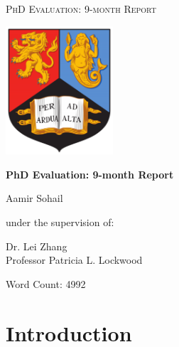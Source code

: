 \documentclass[12pt,a4paper,oneside,]{book} %
\begin{document}
\frontmatter
\thispagestyle{empty}
\def\drop{.1\textheight}

\vspace*{\drop}
\begin{center}
\Huge \textsc{PhD Evaluation: 9-month Report}
\end{center}

\clearpage
\thispagestyle{empty}
\vspace*{\drop}
\begin{center}
    \includegraphics[width=0.3\textwidth]{figures/birmingham.png} %
\end{center}
\vspace{\baselineskip}

\begin{center}
\Huge\textbf{PhD Evaluation: 9-month Report}\par
\vfill %
{\huge Aamir Sohail}\par
\vspace{1em}
\linespread{1.3}{\normalsize Centre for Human Brain Health\\
University of Birmingham\\ }\par %
\vspace{\baselineskip}
{\normalsize under the supervision of:}\par
{\Large Dr. Lei Zhang\\
Professor Patricia L. Lockwood}\par
\vspace{\baselineskip}
{\small Word Count: 4992}
\end{center}



{
\setcounter{tocdepth}{1}
\tableofcontents
}
\mainmatter
\chapter{Introduction}\label{introduction}
\end{document}
